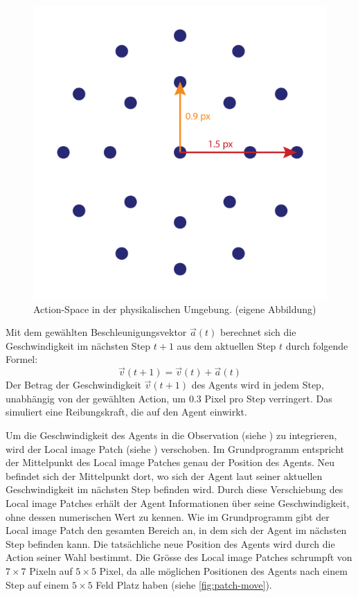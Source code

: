 \begin{figure}[!ht]
 \centering
 \includegraphics[width=\textwidth-6cm]{images/methode/physics-actionspace.png}
 \caption{Action-Space in der physikalischen Umgebung. (eigene Abbildung)}\label{fig:physics-actionspace}
\end{figure}
 
 
Mit dem gewählten Beschleunigungsvektor $\vec{a}(t)$ berechnet sich die
Geschwindigkeit im nächsten Step $t+1$ aus dem aktuellen Step $t$ durch folgende
Formel:
\[ \vec{v}(t+1) = \vec{v}(t) + \vec{a}(t) \] Der Betrag der Geschwindigkeit
$\vec{v}(t+1)$ des Agents wird in jedem Step, unabhängig von der gewählten
Action, um $0.3$ Pixel pro Step verringert. Das simuliert eine Reibungskraft,
die auf den Agent einwirkt.

Um die Geschwindigkeit des Agents in die Observation (siehe
) zu integrieren, wird der Local image Patch (siehe
) verschoben. Im Grundprogramm entspricht der
Mittelpunkt des Local image Patches genau der Position des Agents. Neu befindet
sich der Mittelpunkt dort, wo sich der Agent laut seiner aktuellen
Geschwindigkeit im nächsten Step befinden wird. Durch diese Verschiebung des
Local image Patches erhält der Agent Informationen über seine Geschwindigkeit,
ohne dessen numerischen Wert zu kennen. Wie im Grundprogramm gibt der Local
image Patch den gesamten Bereich an, in dem sich der Agent im nächsten Step
befinden kann. Die tatsächliche neue Position des Agents wird durch die Action
seiner Wahl bestimmt. Die Grösse des Local image Patches schrumpft von
$7\times7$ Pixeln auf $5\times5$ Pixel, da alle möglichen Positionen des Agents
nach einem Step auf einem $5\times5$ Feld Platz haben (siehe
\autoref{fig:patch-move}).
 

